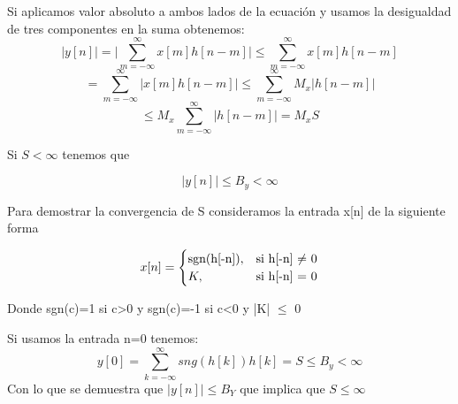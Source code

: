 	Si aplicamos valor absoluto a ambos lados de la ecuación y usamos la desigualdad de tres componentes en la suma obtenemos: 
	\begin{equation}
		\lvert y[n]\rvert = \lvert \sum_{m=-\infty}^{\infty}x[m]h[n-m] \rvert \leq \sum_{m=-\infty}^{\infty}x[m]h[n-m]
	\end{equation}		
	\begin{equation}
		=\sum_{m=-\infty}^{\infty}\lvert x[m]h[n-m] \rvert \leq \sum_{m=-\infty}^{\infty}M_x \lvert h[n-m] \rvert
	\end{equation}
	\begin{equation}
		\leq M_x \sum_{m=-\infty}^{\infty} \lvert h[n-m] \rvert = M_xS
	\end{equation}

	Si $S<\infty$ tenemos que 
	
	\begin{equation}
		|y[n]|\leq B_y < \infty
	\end{equation}
	
	Para demostrar la convergencia de S consideramos la entrada x[n] de la siguiente forma
	
	\[
	x[n]=
	\begin{cases}
		$sgn(h[-n])$, & \text{si h[-n]  $\neq$ 0} \\
		K, & \text{si h[-n] = 0}				\end{cases}
	\]
	
	Donde sgn(c)=1 si c>0 y sgn(c)=-1 si c<0 y |K| $\leq$ 0
	\newline
	
	Si usamos la entrada n=0 tenemos:
	\begin{equation}
		y[0]=\sum_{k=-\infty}^\infty sng(h[k]) h[k] = S \leq B_y < \infty
	\end{equation}
	Con lo que se demuestra que $|y[n]| \leq B_Y$ que implica que $S\leq\infty$

